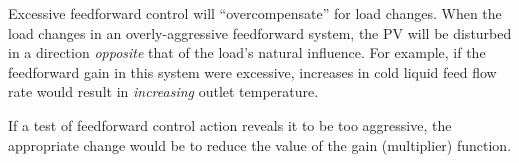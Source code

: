 





Excessive feedforward control will ``overcompensate'' for load changes.  When the load changes in an overly-aggressive feedforward system, the PV will be disturbed in a direction {\it opposite} that of the load's natural influence.  For example, if the feedforward gain in this system were excessive, increases in cold liquid feed flow rate would result in {\it increasing} outlet temperature.

\vskip 10pt

If a test of feedforward control action reveals it to be too aggressive, the appropriate change would be to reduce the value of the gain (multiplier) function.



